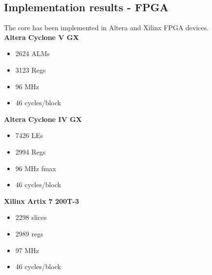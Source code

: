 \documentclass[../main.tex]{subfiles}
\begin{document}
\subsection*{Implementation results - FPGA}
The core has been implemented in Altera and Xilinx FPGA devices.\\
\textbf{Altera Cyclone V GX}
\begin{itemize}
    \item 2624 ALMs
    \item 3123 Regs
    \item 96 MHz
    \item 46 cycles/block
\end{itemize}
\textbf{Altera Cyclone IV GX}
\begin{itemize}
    \item 7426 LEs
    \item 2994 Regs
    \item 96 MHz fmax
    \item 46 cycles/block
\end{itemize}
\textbf{Xilinx Artix 7 200T-3}
\begin{itemize}
    \item 2298 slices
    \item 2989 regs
    \item 97 MHz
    \item 46 cycles/block
\end{itemize}
\end{document}
